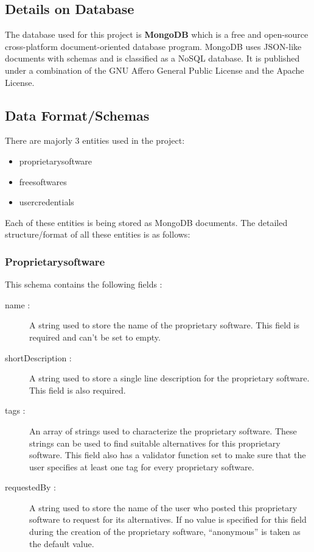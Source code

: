 \subsection{Details on Database}
The database used for this project is \textbf{MongoDB} which is a free and open-source cross-platform document-oriented database program. MongoDB uses JSON-like documents with schemas and is classified as a NoSQL database. It is published under a combination of the GNU Affero General Public License and the Apache License.

\subsection{Data Format/Schemas}
There are majorly 3 entities used in the project:
\begin{itemize}
    \item proprietarysoftware
    \item freesoftwares
    \item usercredentials
\end{itemize}

Each of these entities is being stored as MongoDB documents. The detailed structure/format of all these entities is as follows:


\subsubsection{Proprietarysoftware}
This schema contains the following fields :

\begin{description}
    \item[name : ]
          A string used to store the name of the proprietary software. This field is required and can’t be set to empty.

    \item[shortDescription : ]
          A string used to store a single line description for the proprietary software. This field is also required.

    \item[tags : ]
          An array of strings used to characterize the proprietary software. These strings can be used to find suitable alternatives for this proprietary software. This field also has a validator function set to make sure that the user specifies at least one tag for every proprietary software.

    \item[requestedBy : ]
          A string used to store the name of the user who posted this proprietary software to request for its alternatives. If no value is specified for this field during the creation of the proprietary software, “anonymous” is taken as the default value.

\end{description}

